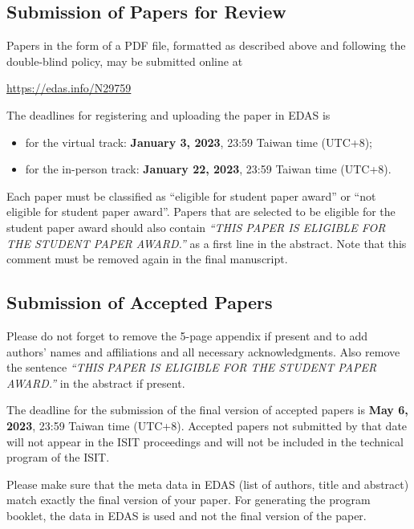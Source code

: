 \documentclass[conference,a4paper]{IEEEtran}
\begin{document}
\subsection{Submission of Papers for Review}
\label{sec:subm-papers-revi}

Papers in the form of a PDF file, formatted as described above and
following the double-blind policy, may be submitted online at
\begin{center}
  \url{https://edas.info/N29759}
\end{center}
The deadlines for registering and uploading the paper in EDAS is
\begin{itemize}
\item for the virtual track: \textbf{January 3, 2023}, 23:59 Taiwan
  time (UTC+8);
\item for the in-person track: \textbf{January 22, 2023}, 23:59 Taiwan
  time (UTC+8).
\end{itemize}
Each paper must be classified as ``eligible for student paper award''
or ``not eligible for student paper award''. Papers that are selected
to be eligible for the student paper award should also contain
\emph{``THIS PAPER IS ELIGIBLE FOR THE STUDENT PAPER AWARD.''} as a
first line in the abstract. Note that this comment must be removed
again in the final manuscript.

\subsection{Submission of Accepted Papers}
\label{sec:subm-final-vers}

Please do not forget to remove the 5-page appendix if present and to
add authors' names and affiliations and all necessary acknowledgments.
Also remove the sentence \emph{``THIS PAPER IS ELIGIBLE FOR THE
  STUDENT PAPER AWARD.''} in the abstract if present.

The deadline for the submission of the final version of accepted
papers is \textbf{May 6, 2023}, 23:59 Taiwan time (UTC+8).  Accepted
papers not submitted by that date will not appear in the ISIT
proceedings and will not be included in the technical program of the
ISIT.

Please make sure that the meta data in EDAS (list of authors, title
and abstract) match exactly the final version of your paper. For
generating the program booklet, the data in EDAS is used and not the
final version of the paper.


%
\end{document}
